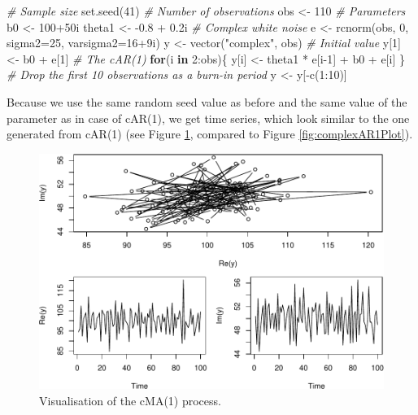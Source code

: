 \documentclass[
]{book}
\newenvironment{Shaded}{\begin{snugshade}}{\end{snugshade}}
\newcommand{\AttributeTok}[1]{\textcolor[rgb]{0.77,0.63,0.00}{#1}}
\newcommand{\CommentTok}[1]{\textcolor[rgb]{0.56,0.35,0.01}{\textit{#1}}}
\newcommand{\ControlFlowTok}[1]{\textcolor[rgb]{0.13,0.29,0.53}{\textbf{#1}}}
\newcommand{\DecValTok}[1]{\textcolor[rgb]{0.00,0.00,0.81}{#1}}
\newcommand{\FloatTok}[1]{\textcolor[rgb]{0.00,0.00,0.81}{#1}}
\newcommand{\FunctionTok}[1]{\textcolor[rgb]{0.00,0.00,0.00}{#1}}
\newcommand{\NormalTok}[1]{#1}
\newcommand{\OtherTok}[1]{\textcolor[rgb]{0.56,0.35,0.01}{#1}}
\newcommand{\SpecialCharTok}[1]{\textcolor[rgb]{0.00,0.00,0.00}{#1}}
\newcommand{\StringTok}[1]{\textcolor[rgb]{0.31,0.60,0.02}{#1}}
\begin{document}
\begin{Shaded}
\begin{Highlighting}[]
\CommentTok{\# Sample size}
\FunctionTok{set.seed}\NormalTok{(}\DecValTok{41}\NormalTok{)}
\CommentTok{\# Number of observations}
\NormalTok{obs }\OtherTok{\textless{}{-}} \DecValTok{110}
\CommentTok{\# Parameters}
\NormalTok{b0 }\OtherTok{\textless{}{-}} \DecValTok{100}\SpecialCharTok{+}\NormalTok{50i}
\NormalTok{theta1 }\OtherTok{\textless{}{-}} \SpecialCharTok{{-}}\FloatTok{0.8} \SpecialCharTok{+} \FloatTok{0.2}\NormalTok{i}
\CommentTok{\# Complex white noise}
\NormalTok{e }\OtherTok{\textless{}{-}} \FunctionTok{rcnorm}\NormalTok{(obs, }\DecValTok{0}\NormalTok{, }\AttributeTok{sigma2=}\DecValTok{25}\NormalTok{, }\AttributeTok{varsigma2=}\DecValTok{16}\SpecialCharTok{+}\NormalTok{9i)}
\NormalTok{y }\OtherTok{\textless{}{-}} \FunctionTok{vector}\NormalTok{(}\StringTok{"complex"}\NormalTok{, obs)}
\CommentTok{\# Initial value}
\NormalTok{y[}\DecValTok{1}\NormalTok{] }\OtherTok{\textless{}{-}}\NormalTok{ b0 }\SpecialCharTok{+}\NormalTok{ e[}\DecValTok{1}\NormalTok{]}
\CommentTok{\# The cAR(1)}
\ControlFlowTok{for}\NormalTok{(i }\ControlFlowTok{in} \DecValTok{2}\SpecialCharTok{:}\NormalTok{obs)\{}
\NormalTok{    y[i] }\OtherTok{\textless{}{-}}\NormalTok{ theta1 }\SpecialCharTok{*}\NormalTok{ e[i}\DecValTok{{-}1}\NormalTok{] }\SpecialCharTok{+}\NormalTok{ b0 }\SpecialCharTok{+}\NormalTok{ e[i]}
\NormalTok{\}}
\CommentTok{\# Drop the first 10 observations as a burn{-}in period}
\NormalTok{y }\OtherTok{\textless{}{-}}\NormalTok{ y[}\SpecialCharTok{{-}}\FunctionTok{c}\NormalTok{(}\DecValTok{1}\SpecialCharTok{:}\DecValTok{10}\NormalTok{)]}
\end{Highlighting}
\end{Shaded}

Because we use the same random seed value as before and the same value of the parameter as in case of cAR(1), we get time series, which look similar to the one generated from cAR(1) (see Figure \ref{fig:complexMA1Plot}, compared to Figure \ref{fig:complexAR1Plot}).

\begin{figure}
\centering
\includegraphics{Svetunkov---Svetunkov---Complex-Valued-Econometrics_files/figure-latex/complexMA1Plot-1.pdf}
\caption{\label{fig:complexMA1Plot}Visualisation of the cMA(1) process.}
\end{figure}
\end{document}
